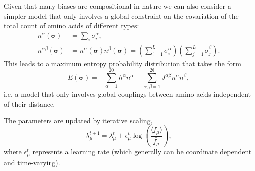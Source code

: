 \documentclass[superscriptaddress,twocolumn,pre]{revtex4}
\newcommand{\B}{\boldsymbol}
\newcommand{\<}{\langle}
\renewcommand{\>}{\rangle}
\begin{document}
Given that many biases are compositional in nature we can also consider a simpler model that only involves a global constraint on the covariation of the total count of amino acids of different types:
\begin{align}
    n^\alpha(\B \sigma) &= \sum_i \sigma_i^\alpha, \\
    n^{\alpha\beta}(\B \sigma) &= n^\alpha(\B \sigma) n^\beta(\B\sigma) = \left(\sum_{i=1}^L \sigma_i^\alpha\right) \left(\sum_{j=1}^L \sigma_j^\beta\right).
\end{align}
This leads to a maximum entropy probability distribution that takes the form
\begin{equation}
    E(\boldsymbol \sigma) = - \sum_{\alpha=1}^{20} h^\alpha n^\alpha -  \sum_{\alpha,\beta = 1}^{20} J^{\alpha \beta} n^\alpha n^\beta,
\end{equation}
i.e. a model that only involves global couplings between amino acids independent of their distance.


The parameters are updated by iterative scaling,
\begin{equation}
    \lambda_\mu^{t+1} = \lambda_\mu^t + \epsilon_\mu^t \log \left( \frac{\langle f_\mu \rangle}{\bar{f_\mu}} \right),
\end{equation}
where $\epsilon_\mu^t$ represents a learning rate (which generally can be coordinate dependent and time-varying).
\end{document}
